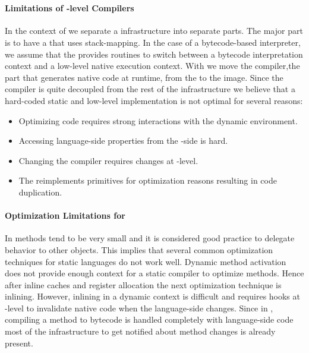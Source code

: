\\

\paragraph{Limitations of \VM-level \JIT Compilers}
In the context of \NBJ we separate a \JIT infrastructure into separate parts.
The major part is to have a \VM that uses stack-mapping.
In the case of a bytecode-based interpreter, we assume that the \VM provides routines to switch between a bytecode interpretation context and a low-level native execution context.
With \NBJ we move the \JIT compiler,the part that generates native code at runtime, from the \VM to the image.%
 Since the \JIT compiler is quite decoupled from the rest of the \JIT infrastructure we believe that a hard-coded static and low-level implementation is not optimal for several reasons:

\begin{itemize}
	\item Optimizing \ST code requires strong interactions with the dynamic environment.
	\item Accessing language-side properties from the \VM-side is hard.
	\item Changing the \JIT compiler requires changes at \VM-level.
	\item The \JIT reimplements primitives for optimization reasons resulting in code duplication.
\end{itemize}

\paragraph{Optimization Limitations for \PH}
In \ST methods tend to be very small and it is considered good practice to delegate behavior to other objects.
This implies that several common optimization techniques for static languages do not work well.
Dynamic method activation does not provide enough context for a static compiler to optimize methods.
Hence after inline caches and register allocation the next optimization technique is inlining.
However, inlining in a dynamic context is difficult and requires hooks at \VM-level to invalidate native code when the language-side changes.
Since in \PH, compiling a method to bytecode is handled completely with language-side code most of the infrastructure to get notified about method changes is already present.

